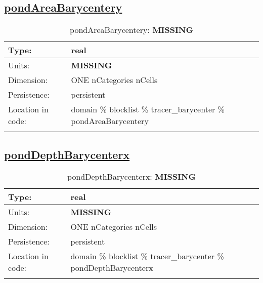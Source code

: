 \subsection[pondAreaBarycentery]{\hyperref[sec:var_tab_tracer_barycenter]{pondAreaBarycentery}}
\label{subsec:var_sec_tracer_barycenter_pondAreaBarycentery}
\begin{center}
\begin{longtable}{| p{2.0in} | p{4.0in} |}
        \hline 
        Type: & real \\
        \hline 
        Units: & {\bf \color{red} MISSING} \\
        \hline 
        Dimension: & ONE nCategories nCells \\
        \hline 
        Persistence: & persistent \\
        \hline 
         Location in code: & domain \% blocklist \% tracer\_barycenter \% pondAreaBarycentery \\
         \hline 
    \caption{pondAreaBarycentery: {\bf \color{red} MISSING}}
\end{longtable}
\end{center}
\subsection[pondDepthBarycenterx]{\hyperref[sec:var_tab_tracer_barycenter]{pondDepthBarycenterx}}
\label{subsec:var_sec_tracer_barycenter_pondDepthBarycenterx}
\begin{center}
\begin{longtable}{| p{2.0in} | p{4.0in} |}
        \hline 
        Type: & real \\
        \hline 
        Units: & {\bf \color{red} MISSING} \\
        \hline 
        Dimension: & ONE nCategories nCells \\
        \hline 
        Persistence: & persistent \\
        \hline 
         Location in code: & domain \% blocklist \% tracer\_barycenter \% pondDepthBarycenterx \\
         \hline 
    \caption{pondDepthBarycenterx: {\bf \color{red} MISSING}}
\end{longtable}
\end{center}
